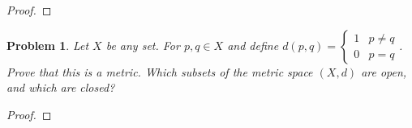 \documentclass[11pt]{article}
\newcommand{\<}{\langle}
\renewcommand{\>}{\rangle}
\newtheorem{problem}{Problem}[section]
\newenvironment{fprob}
  {\begin{fcolor}\begin{problem}}
  {\end{problem}\end{fcolor}}
\theoremstyle{definition}
\begin{document}
\begin{proof}
\end{proof}


\begin{fprob}
    Let $X$ be any set. For $p,q\in X$ and define $d(p,q)=\begin{cases} 1 & p\neq q \\ 0 & p=q\end{cases}$.
    Prove that this is a metric. Which subsets of the metric space $(X,d)$ are open, and which are closed?
\end{fprob}

\begin{proof}
\end{proof}
\end{document}
